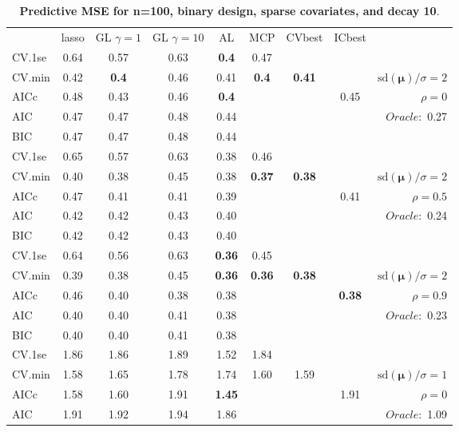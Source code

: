 \clearpage
\begin{table}\vspace{-.5cm}
\caption[l]{ { \bf Predictive MSE for n=100, binary design, 
sparse covariates, and  decay  10}.}
\vspace{-.5cm}
\footnotesize{}
\begin{center}
\begin{tabular}{l*{7}{c}|r}
 & lasso & GL $\gamma=1$ & GL $\gamma=10$ & AL & MCP  & CVbest & ICbest  \\
\cline{1-9}
CV.1se & 0.64 & 0.57 & 0.63 & {\bf 0.4} & 0.47 & & & \\
CV.min & 0.42 & {\bf 0.4} & 0.46 & 0.41 & {\bf 0.4} & {\bf 0.41} & & $\mathrm{sd}(\mathbf{\mu})/\sigma=2$ \\
AICc & 0.48 & 0.43 & 0.46 & {\bf 0.4} & & & 0.45 &  $\rho=0$ \\
AIC & 0.47 & 0.47 & 0.48 & 0.44 & & & &  \multirow{2}{*}{$Oracle: $ 0.27} \\
BIC & 0.47 & 0.47 & 0.48 & 0.44 & & & &  \\
 \hline 
CV.1se & 0.65 & 0.57 & 0.63 & 0.38 & 0.46 & & & \\
CV.min & 0.40 & 0.38 & 0.45 & 0.38 & {\bf 0.37} & {\bf 0.38} & & $\mathrm{sd}(\mathbf{\mu})/\sigma=2$ \\
AICc & 0.47 & 0.41 & 0.41 & 0.39 & & & 0.41 &  $\rho=0.5$ \\
AIC & 0.42 & 0.42 & 0.43 & 0.40 & & & &  \multirow{2}{*}{$Oracle: $ 0.24} \\
BIC & 0.42 & 0.42 & 0.43 & 0.40 & & & &  \\
 \hline 
CV.1se & 0.64 & 0.56 & 0.63 & {\bf 0.36} & 0.45 & & & \\
CV.min & 0.39 & 0.38 & 0.45 & {\bf 0.36} & {\bf 0.36} & {\bf 0.38} & & $\mathrm{sd}(\mathbf{\mu})/\sigma=2$ \\
AICc & 0.46 & 0.40 & 0.38 & 0.38 & & & {\bf 0.38} &  $\rho=0.9$ \\
AIC & 0.40 & 0.40 & 0.41 & 0.38 & & & &  \multirow{2}{*}{$Oracle: $ 0.23} \\
BIC & 0.40 & 0.40 & 0.41 & 0.38 & & & &  \\
 \hline 
CV.1se & 1.86 & 1.86 & 1.89 & 1.52 & 1.84 & & & \\
CV.min & 1.58 & 1.65 & 1.78 & 1.74 & 1.60 & 1.59 & & $\mathrm{sd}(\mathbf{\mu})/\sigma=1$ \\
AICc & 1.58 & 1.60 & 1.91 & {\bf 1.45} & & & 1.91 &  $\rho=0$ \\
AIC & 1.91 & 1.92 & 1.94 & 1.86 & & & &  \multirow{2}{*}{$Oracle: $ 1.09} \\

\end{tabular}
\end{center}
\end{table}
